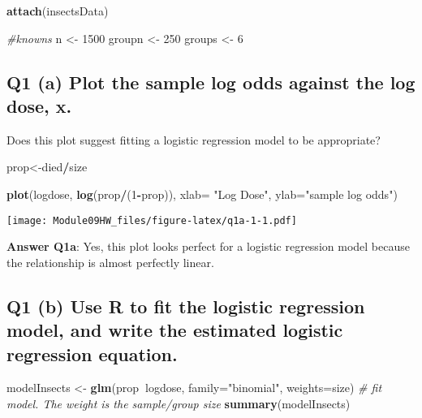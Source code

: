 \documentclass[
]{article}
\newenvironment{Shaded}{\begin{snugshade}}{\end{snugshade}}
\newcommand{\CommentTok}[1]{\textcolor[rgb]{0.56,0.35,0.01}{\textit{#1}}}
\newcommand{\DataTypeTok}[1]{\textcolor[rgb]{0.13,0.29,0.53}{#1}}
\newcommand{\DecValTok}[1]{\textcolor[rgb]{0.00,0.00,0.81}{#1}}
\newcommand{\KeywordTok}[1]{\textcolor[rgb]{0.13,0.29,0.53}{\textbf{#1}}}
\newcommand{\NormalTok}[1]{#1}
\newcommand{\OperatorTok}[1]{\textcolor[rgb]{0.81,0.36,0.00}{\textbf{#1}}}
\newcommand{\StringTok}[1]{\textcolor[rgb]{0.31,0.60,0.02}{#1}}
\begin{document}
\begin{Shaded}
\begin{Highlighting}[]
\KeywordTok{attach}\NormalTok{(insectsData)}

\CommentTok{#knowns}
\NormalTok{n <-}\StringTok{ }\DecValTok{1500}
\NormalTok{groupn <-}\StringTok{ }\DecValTok{250}
\NormalTok{groups  <-}\StringTok{ }\DecValTok{6}
\end{Highlighting}
\end{Shaded}

\hypertarget{q1-a-plot-the-sample-log-odds-against-the-log-dose-x.}{%
\subsection{Q1 (a) Plot the sample log odds against the log dose,
x.}\label{q1-a-plot-the-sample-log-odds-against-the-log-dose-x.}}

Does this plot suggest fitting a logistic regression model to be
appropriate?

\begin{Shaded}
\begin{Highlighting}[]
\NormalTok{prop<-died}\OperatorTok{/}\NormalTok{size}

\KeywordTok{plot}\NormalTok{(logdose, }\KeywordTok{log}\NormalTok{(prop}\OperatorTok{/}\NormalTok{(}\DecValTok{1}\OperatorTok{-}\NormalTok{prop)), }\DataTypeTok{xlab=} \StringTok{"Log Dose"}\NormalTok{, }\DataTypeTok{ylab=}\StringTok{"sample log odds"}\NormalTok{)}
\end{Highlighting}
\end{Shaded}

\texttt{[image: Module09HW\_files/figure-latex/q1a-1-1.pdf]}

\textbf{Answer Q1a}: Yes, this plot looks perfect for a logistic
regression model because the relationship is almost perfectly linear.

\hypertarget{q1-b-use-r-to-fit-the-logistic-regression-model-and-write-the-estimated-logistic-regression-equation.}{%
\subsection{Q1 (b) Use R to fit the logistic regression model, and write
the estimated logistic regression
equation.}\label{q1-b-use-r-to-fit-the-logistic-regression-model-and-write-the-estimated-logistic-regression-equation.}}

\begin{Shaded}
\begin{Highlighting}[]
\NormalTok{modelInsects <-}\StringTok{ }\KeywordTok{glm}\NormalTok{(prop}\OperatorTok{~}\NormalTok{logdose, }\DataTypeTok{family=}\StringTok{"binomial"}\NormalTok{, }\DataTypeTok{weights=}\NormalTok{size) }\CommentTok{# fit model. The weight is the sample/group size}
\KeywordTok{summary}\NormalTok{(modelInsects)}
\end{Highlighting}
\end{Shaded}
\end{document}
